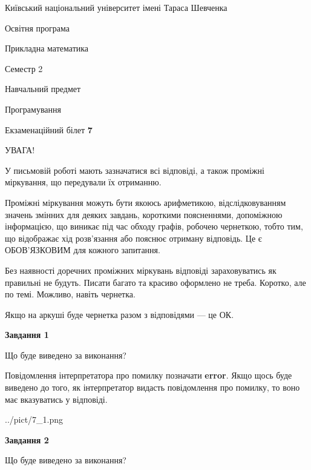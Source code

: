 \documentclass[12pt, ukrainian]{article}
\begin{document}
{{\begin {small}\par
{ \center  Київський національний університет імені Тараса Шевченка \par}
{\parbox {5 cm}{Освітня програма \hfill}{\parbox {7 cm}{Прикладна математика \hfill}}\parbox {6 cm}{\hfill Семестр 2}}\par
{\parbox {5 cm} {Навчальний предмет \hfill}\parbox {7 cm}{Програмування \hfill}\parbox {6cm}{\hfill}\par}\vspace{-7pt} \end{small}}{\center Екзаменаційний білет \No \textbf
{ 7 }\par}}
{
\begin {large}
УВАГА!

У письмовій роботі мають зазначатися всі відповіді, а також проміжні міркування, що передували їх отриманню.

Проміжні міркування можуть бути якоюсь арифметикою, відслідковуванням зна\-чень змінних для деяких завдань,
короткими поясненнями, допоміжною інформацією, що виникає під час обходу графів, робочею чернеткою,
тобто тим, що відображає хід розв’язання або пояснює отриману відповідь.
Це є ОБОВ’ЯЗКОВИМ для кожного запитання.

Без наявності доречних проміжних міркувань відповіді зараховуватись як правиль\-ні не будуть.
Писати багато та красиво оформлено не треба. Коротко, але по темі. Можли\-во, навіть чернетка.

Якщо на аркуші буде чернетка разом з відповідями --- це ОК.

\newpage

{\begin {center}\textbf{Завдання 1}\end {center}}\par
Що буде виведено за виконання?

Повідомлення інтерпретатора про помилку позначати \textbf{error}.
Якщо щось буде виведено до того, як інтерпретатор видасть повідомлення про помилку, 
то воно має вказуватись у відповіді. \par


\begin{center}
	{../pict/7_1.png}
\end{center}
\newpage

{\begin {center}\textbf{Завдання 2}\end {center}}\par
Що буде виведено за виконання?


\end{large}}
\end{document}
